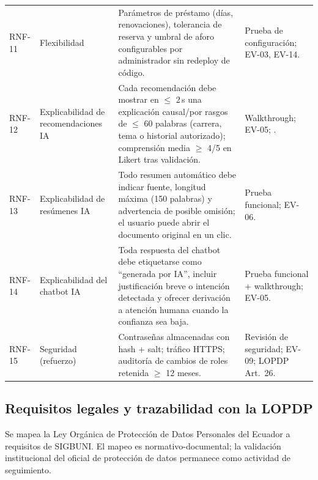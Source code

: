 \documentclass[12pt,journal,onecolumn]{IEEEtran}
\begin{document}
\begin{longtable}{P{0.10\textwidth}P{0.20\textwidth}P{0.48\textwidth}P{0.17\textwidth}}
RNF-11 & Flexibilidad & Parámetros de préstamo (días, renovaciones), tolerancia de reserva y umbral de aforo configurables por administrador sin redeploy de código. & Prueba de configuración; EV-03, EV-14.\\
RNF-12 & Explicabilidad de recomendaciones IA & Cada recomendación debe mostrar en $\leq$ 2\,s una explicación causal/por rasgos de $\leq$ 60 palabras (carrera, tema o historial autorizado); comprensión media $\geq$ 4/5 en Likert tras validación. & Walkthrough; EV-05; \cite{chazette2022explainable}.\\
RNF-13 & Explicabilidad de resúmenes IA & Todo resumen automático debe indicar fuente, longitud máxima (150 palabras) y advertencia de posible omisión; el usuario puede abrir el documento original en un clic. & Prueba funcional; EV-06.\\
RNF-14 & Explicabilidad del chatbot IA & Toda respuesta del chatbot debe etiquetarse como ``generada por IA'', incluir justificación breve o intención detectada y ofrecer derivación a atención humana cuando la confianza sea baja. & Prueba funcional + walkthrough; EV-05.\\
RNF-15 & Seguridad (refuerzo) & Contraseñas almacenadas con hash + salt; tráfico HTTPS; auditoría de cambios de roles retenida $\geq$ 12 meses. & Revisión de seguridad; EV-09; LOPDP Art.~26.\\\bottomrule
\end{longtable}

\subsection{Requisitos legales y trazabilidad con la LOPDP}
Se mapea la Ley Orgánica de Protección de Datos Personales del Ecuador \cite{lopdp2021} a requisitos de SIGBUNI. El mapeo es normativo-documental; la validación institucional del oficial de protección de datos permanece como actividad de seguimiento.
\end{document}
